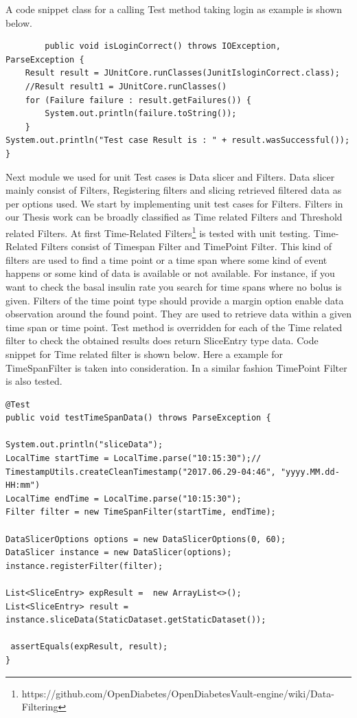 \documentclass[article,type=msc,colorback,accentcolor=tud9c,twoside,11pt]{tudthesis}
\begin{document}
A code snippet class for a calling Test method taking login as example is shown below.
\begin{lstlisting}
		public void isLoginCorrect() throws IOException, ParseException {
	Result result = JUnitCore.runClasses(JunitIsloginCorrect.class);
	//Result result1 = JUnitCore.runClasses()
	for (Failure failure : result.getFailures()) {
		System.out.println(failure.toString());
	}
System.out.println("Test case Result is : " + result.wasSuccessful());
}
\end{lstlisting}

Next module we used for unit Test cases is Data slicer and Filters. Data slicer mainly consist of Filters, Registering filters and slicing retrieved filtered data as per options used. We start by implementing unit test cases for Filters. Filters in our Thesis work can be broadly classified as Time related Filters and Threshold related Filters. At first Time-Related Filters\footnote{https://github.com/OpenDiabetes/OpenDiabetesVault-engine/wiki/Data-Filtering} is tested with unit testing. Time-Related Filters consist of Timespan Filter and TimePoint Filter. This kind of filters are used to find a time point or a time span where some kind of event happens or some kind of data is available or not available. For instance, if you want to check the basal insulin rate you search for time spans where no bolus is given. Filters of the time point type should provide a margin option enable data observation around the found point. They are used to retrieve data within a given time span or time point. Test method is overridden for each of the Time related filter to check the obtained results does return SliceEntry type data. Code snippet for Time related filter is shown below. Here a example for TimeSpanFilter is taken into consideration. In a similar fashion TimePoint Filter is also tested.
\begin{lstlisting}
@Test
public void testTimeSpanData() throws ParseException {

System.out.println("sliceData");
LocalTime startTime = LocalTime.parse("10:15:30");//  TimestampUtils.createCleanTimestamp("2017.06.29-04:46", "yyyy.MM.dd-HH:mm")
LocalTime endTime = LocalTime.parse("10:15:30");
Filter filter = new TimeSpanFilter(startTime, endTime);

DataSlicerOptions options = new DataSlicerOptions(0, 60);
DataSlicer instance = new DataSlicer(options);
instance.registerFilter(filter);

List<SliceEntry> expResult =  new ArrayList<>();
List<SliceEntry> result = instance.sliceData(StaticDataset.getStaticDataset());

 assertEquals(expResult, result);
}
\end{lstlisting}
\end{document}
